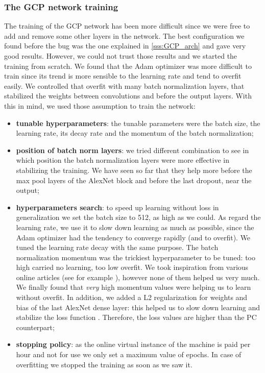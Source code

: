 \subsubsection{The GCP network training}\label{sss:GCP_training}
The training of the GCP network has been more difficult since we were free to add and remove some other layers in the network. The best configuration we found before the bug was the one explained in \ref{sss:GCP_arch} and gave very good results. However, we could not trust those results and we started the training from scratch. We found that the Adam optimizer was more difficult to train since its trend is more sensible to the learning rate and tend to overfit easily. We controlled that overfit with many batch normalization layers, that stabilized the weights between convolutions and before the output layers. With this in mind, we used those assumption to train the network:
\begin{itemize}
    \item \textbf{tunable hyperparameters}: the tunable parameters were the batch size, the learning rate, its decay rate and the momentum of the batch normalization;
    \item \textbf{position of batch norm layers}: we tried different combination to see in which position the batch normalization layers were more effective in stabilizing the training. We have seen so far that they help more before the max pool layers of the AlexNet block and before the last dropout, near the output;
    \item \textbf{hyperparameters search}: to speed up learning without loss in generalization we set the batch size to 512, as high as we could. As regard the learning rate, we use it to slow down learning as much as possible, since the Adam optimizer had the tendency to converge rapidly (and to overfit). We tuned the learning rate decay with the same purpose. The batch normalization momentum was the trickiest hyperparameter to be tuned: too high carried no learning, too low overfit. We took inspiration from various online articles (see for example \cite{batch_norm_online}), however none of them helped us very much. We finally found that \emph{very} high momentum values were helping us to learn without overfit. In addition, we added a L2 regularization for weights and bias of the last AlexNet dense layer: this helped us to slow down learning and stabilize the loss function \cite{l2_neural_networks}. Therefore, the loss values are higher than the PC counterpart;
    \item \textbf{stopping policy}: as the online virtual instance of the machine is paid per hour and not for use we only set a maximum value of epochs. In case of overfitting we stopped the training as soon as we saw it.
\end{itemize}

